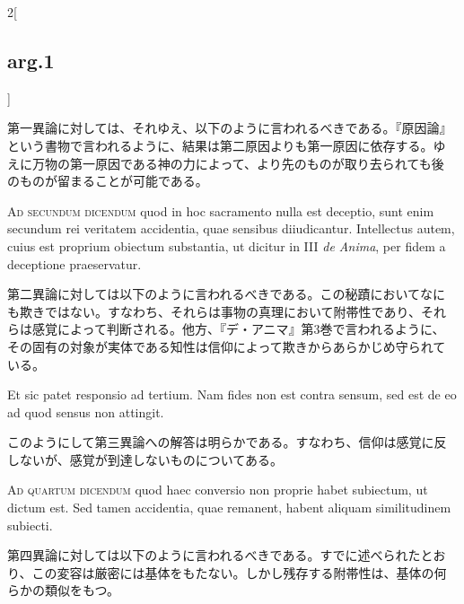 \documentclass[paper=a4paper,fontsize=10pt,jafontsize=9pt,titlepage]{jlreq}
\begin{document}
\begin{paracol}{2}[\subsection{arg.1}]
\switchcolumn

第一異論に対しては、それゆえ、以下のように言われるべきである。『原因論』
という書物で言われるように、結果は第二原因よりも第一原因に依存する。ゆ
えに万物の第一原因である神の力によって、より先のものが取り去られても後
のものが留まることが可能である。

\switchcolumn*[\subsection{ad.2}]

{\scshape Ad secundum dicendum} quod in hoc sacramento nulla est
deceptio, sunt enim secundum rei veritatem accidentia, quae sensibus
diiudicantur. Intellectus autem, cuius est proprium obiectum
substantia, ut dicitur in III {\itshape de Anima}, per fidem a
deceptione praeservatur.

\switchcolumn

第二異論に対しては以下のように言われるべきである。この秘蹟においてなに
も欺きではない。すなわち、それらは事物の真理において附帯性であり、それ
らは感覚によって判断される。他方、『デ・アニマ』第3巻で言われるように、
その固有の対象が実体である知性は信仰によって欺きからあらかじめ守られて
いる。

\switchcolumn*[\subsection{ad.3}]

Et sic patet responsio ad tertium. Nam fides non est contra sensum,
sed est de eo ad quod sensus non attingit.

\switchcolumn

このようにして第三異論への解答は明らかである。すなわち、信仰は感覚に反
しないが、感覚が到達しないものについてある。

\switchcolumn*[\subsection{ad.4}]

{\scshape Ad quartum dicendum} quod haec conversio non proprie habet
subiectum, ut dictum est. Sed tamen accidentia, quae remanent, habent
aliquam similitudinem subiecti.

\switchcolumn

第四異論に対しては以下のように言われるべきである。すでに述べられたとお
り、この変容は厳密には基体をもたない。しかし残存する附帯性は、基体の何
らかの類似をもつ。

\end{paracol}
\newpage
\end{document}
